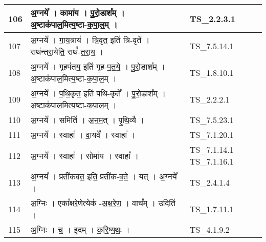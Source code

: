 \documentclass[17pt]{extarticle}
\begin{document}
\begin{longtable}{||p{0.4in}||p{4.9in}||p{0.9in}||}
    \hline
        
    106 & अ॒ग्नये᳚   ।   कामा॑य   ।   पु॒रो॒डाश᳚म्   ।   अ॒ष्टाक॑पाल॒मित्य॒ष्टा{-}क॒पा॒ल॒म्   ।    & TS\_2.2.3.1       \\
    
    \hline
        
    107 & अ॒ग्नये᳚   ।   गा॒य॒त्राय॑   ।   त्रि॒वृत॒ इति॑ त्रि{-}वृते᳚   ।   राथ॑न्तरा॒येति॒ राथं᳚{-}त॒रा॒य॒   ।    & TS\_7.5.14.1       \\
    
    \hline
        
    108 & अ॒ग्नये᳚   ।   गृ॒हप॑तय॒ इति॑ गृ॒ह{-}प॒त॒ये॒   ।   पु॒रो॒डाश᳚म्   ।   अ॒ष्टाक॑पाल॒मित्य॒ष्टा{-}क॒पा॒ल॒म्   ।    & TS\_1.8.10.1       \\
    
    \hline
        
    109 & अ॒ग्नये᳚   ।   प॒थि॒कृत॒ इति॑ पथि{-}कृते᳚   ।   पु॒रो॒डाश᳚म्   ।   अ॒ष्टाक॑पाल॒मित्य॒ष्टा{-}क॒पा॒ल॒म्   ।    & TS\_2.2.2.1       \\
    
    \hline
        
    110 & अ॒ग्नये᳚   ।   समिति॑   ।   अ॒न॒म॒त्   ।   पृ॒थि॒व्यै   ।    & TS\_7.5.23.1       \\
    
    \hline
        
    111 & अ॒ग्नये᳚   ।   स्वाहा᳚   ।   वा॒यवे᳚   ।   स्वाहा᳚   ।    & TS\_7.1.20.1       \\
    
    \hline
        
    112 & अ॒ग्नये᳚   ।   स्वाहा᳚   ।   सोमा॑य   ।   स्वाहा᳚   ।    & TS\_7.1.14.1 TS\_7.1.16.1       \\
    
    \hline
        
    113 & अ॒ग्नय᳚   ।   प्रती॑कवत॒ इति॒ प्रती॑क{-}व॒ते॒   ।   यत्   ।   अ॒ग्नये᳚   ।    & TS\_2.4.1.4       \\
    
    \hline
        
    114 & अ॒ग्निः   ।   एका᳚क्षरे॒णेत्येक॑ {-}अ॒क्ष॒रे॒ण॒   ।   वाच᳚म्   ।   उदिति॑   ।    & TS\_1.7.11.1       \\
    
    \hline
        
    115 & अ॒ग्निः   ।   च॒   ।   इ॒दम्   ।   क॒रि॒ष्य॒थः॒   ।    & TS\_4.1.9.2       \\
    

\end{longtable}
\end{document}

